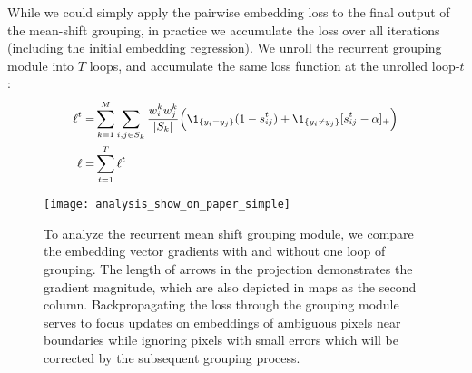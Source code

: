 While we could simply apply the pairwise embedding loss to the final output of
the mean-shift grouping, in practice we accumulate the loss over all iterations
(including the initial embedding regression).
We unroll the recurrent grouping module into $T$ loops,
and accumulate the same loss function at the unrolled loop-$t$:
\begin{equation}
\small
\begin{split}
\ell^{t} =&  \sum_{k=1}^M  \sum_{i,j \in S_k} \frac{w^k_i w^k_j}{\vert S_k \vert}  \Big( \1_{\{y_i=y_j\}} ( 1 - s_{ij}^{t})   + \1_{\{y_i\not=y_j\}} [s^{t}_{ij}-\alpha]_{+} \Big) \\
\ell =& \sum_{t=1}^T \ell^{t}
\end{split}
\nonumber
\end{equation}




\begin{figure}[t]
\centering
   \texttt{[image: analysis\_show\_on\_paper\_simple]}
   \vspace{-6mm}
   \caption{To analyze the recurrent mean shift grouping module, we compare the
   embedding vector gradients with and without one loop of grouping.  The
   length of arrows in the projection demonstrates the gradient magnitude,
   which are also depicted in maps as the second column. Backpropagating the
   loss through the grouping module serves to focus updates on embeddings of
   ambiguous pixels near boundaries while ignoring pixels with small errors
   which will be corrected by the subsequent grouping process.
   }
   \vspace{-2mm}
\label{fig:analysis_show_on_paper}
\end{figure}

